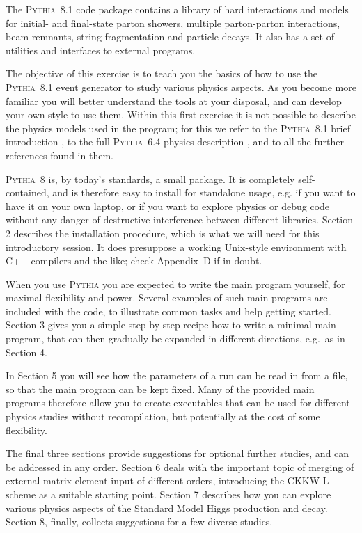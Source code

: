 \documentclass[12pt,a4paper]{article}
\begin{document}
The \textsc{Pythia}~8.1 code package contains a library of hard
interactions and models for initial- and final-state parton showers,
multiple parton-parton interactions, beam remnants, string
fragmentation and particle decays. It also has a set of utilities and
interfaces to external programs.

The objective of this exercise is to teach you the basics of how to
use the \textsc{Pythia}~8.1 event generator to study various physics
aspects.  As you become more familiar you will better understand the
tools at your disposal, and can develop your own style to use
them. Within this first exercise it is not possible to describe the
physics models used in the program; for this we refer to the
\textsc{Pythia}~8.1 brief introduction \cite{pythiaeight}, to the full
\textsc{Pythia}~6.4 physics description \cite{pythiasix}, and to all
the further references found in them.

\textsc{Pythia}~8 is, by today's standards, a small package.
It is completely self-contained, and is therefore easy to install for
standalone usage, e.g. if you want to have it on your own laptop,
or if you want to explore physics or debug code without any danger 
of destructive interference between different libraries. Section 2 
describes the installation procedure, which is what we will need for 
this introductory session. It does presuppose a working Unix-style
environment with C++ compilers and the like; check Appendix~D if in doubt.

When you use \textsc{Pythia} you are expected to write the main program
yourself, for maximal flexibility and power. Several examples of such
main programs are included with the code, to illustrate common tasks
and help getting started. Section 3 gives you a simple step-by-step 
recipe how to write a minimal main program, that can then gradually 
be expanded in different directions, e.g.\ as in Section 4.

In Section 5 you will see how the parameters of a run can be read in 
from a file, so that the main program can be kept fixed. Many of the 
provided main programs therefore allow you to create executables that 
can be used for different physics studies without recompilation,
but potentially at the cost of some flexibility.  

The final three sections provide suggestions for optional further studies,
and can be addressed in any order. Section 6 deals with the important 
topic of merging of external matrix-element input of different orders,
introducing the {\smaller CKKW-L} scheme as a suitable starting point.
Section 7 describes how you can explore various physics aspects of the
Standard Model Higgs production and decay. Section 8, finally, collects
suggestions for a few diverse studies.    
\end{document}
